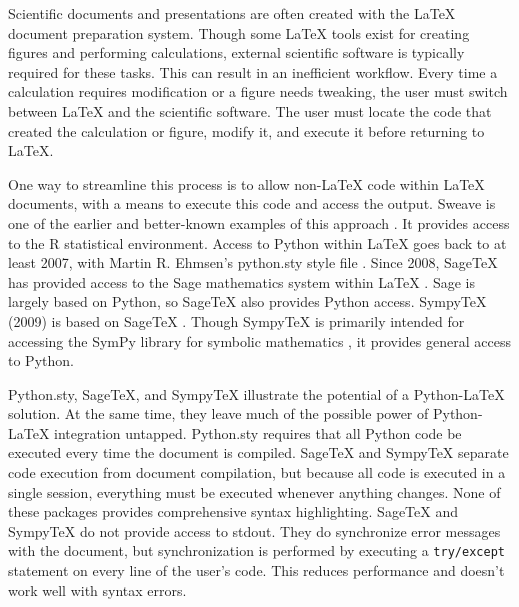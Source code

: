 \documentclass[letterpaper,compsoc,twoside]{IEEEtran}
\begin{document}
Scientific documents and presentations are often created with the LaTeX
document preparation system. Though some LaTeX tools exist for creating
figures and performing calculations, external scientific software is
typically required for these tasks. This can result in an inefficient
workflow. Every time a calculation requires modification or a figure
needs tweaking, the user must switch between LaTeX and the scientific
software. The user must locate the code that created the calculation or
figure, modify it, and execute it before returning to LaTeX.

One way to streamline this process is to allow non-LaTeX code within
LaTeX documents, with a means to execute this code and access the
output. Sweave is one of the earlier and better-known examples of this
approach \cite{Sweave}.  It provides access to the R statistical environment.
Access to Python within LaTeX goes back to at least
2007, with Martin R. Ehmsen's python.sty style file \cite{Ehmsen}. Since 2008,
SageTeX has provided access to the Sage mathematics system within LaTeX
\cite{SageTeX}. Sage is largely based on Python, so SageTeX also provides
Python access. SympyTeX (2009) is based on SageTeX \cite{SympyTeX}. Though
SympyTeX is primarily intended for accessing the SymPy library for
symbolic mathematics \cite{SymPy}, it provides general access to Python.

Python.sty, SageTeX, and SympyTeX illustrate the potential of a
Python-LaTeX solution. At the same time, they leave much of the
possible power of Python-LaTeX integration untapped.  Python.sty requires
that all Python code be executed every time the document is compiled.
SageTeX and SympyTeX separate code execution from document compilation,
but because all code is executed in a single session, everything must
be executed whenever anything changes.  None of these packages provides
comprehensive syntax highlighting.  SageTeX and SympyTeX do not
provide access to stdout.  They do synchronize error messages with
the document, but synchronization is performed by executing a \texttt{try/except}
statement on every line of the user's code.  This reduces performance
and doesn't work well with syntax errors.
\end{document}
